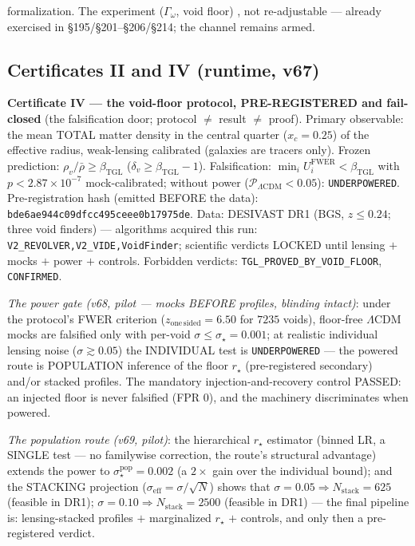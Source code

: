 \documentclass[11pt]{article}
\newcommand{\bTGL}{\beta_{\mathrm{TGL}}}\newcommand{\Msun}{M_{\odot}}\newcommand{\TGL}{\mathrm{TGL}}
\theoremstyle{definition}\newtheorem{deriv}{Derivation}
\begin{document}
formalization. The experiment ($\Gamma_\omega$, void floor) , not re-adjustable --- already exercised in \S195/\S201--\S206/\S214; the channel remains armed.

\subsection*{Certificates II and IV (runtime, v67)}

\textbf{Certificate IV --- the void-floor protocol, PRE-REGISTERED and fail-closed} (the falsification door; protocol $\neq$ result $\neq$ proof). Primary observable: the mean TOTAL matter density in the central quarter ($x_c=0.25$) of the effective radius, weak-lensing calibrated (galaxies are tracers only). Frozen prediction: $\rho_v/\bar\rho\ge\bTGL$ ($\delta_v\ge\bTGL-1$). Falsification: $\min_i U_i^{\mathrm{FWER}}<\bTGL$ with $p<2.87\times10^{-7}$ mock-calibrated; without power ($\mathcal P_{\Lambda\mathrm{CDM}}<0.05$): \texttt{UNDERPOWERED}. Pre-registration hash (emitted BEFORE the data): \texttt{bde6ae944c09dfcc495ceee0b17975de}. Data: DESIVAST DR1 (BGS, $z\le0.24$; three void finders) --- algorithms acquired this run: \texttt{V2\_REVOLVER,V2\_VIDE,VoidFinder}; scientific verdicts LOCKED until lensing $+$ mocks $+$ power $+$ controls. Forbidden verdicts: \texttt{TGL\_PROVED\_BY\_VOID\_FLOOR}, \texttt{CONFIRMED}.

\emph{The power gate (v68, pilot --- mocks BEFORE profiles, blinding intact)}: under the protocol's FWER criterion ($z_{\mathrm{one\,sided}}=6.50$ for $7235$ voids), floor-free $\Lambda$CDM mocks are falsified only with per-void $\sigma\le\sigma_\star=0.001$; at realistic individual lensing noise ($\sigma\gtrsim0.05$) the INDIVIDUAL test is \texttt{UNDERPOWERED} --- the powered route is POPULATION inference of the floor $r_\star$ (pre-registered secondary) and/or stacked profiles. The mandatory injection-and-recovery control PASSED: an injected floor is never falsified (FPR $0$), and the machinery discriminates when powered.

\emph{The population route (v69, pilot)}: the hierarchical $r_\star$ estimator (binned LR, a SINGLE test --- no familywise correction, the route's structural advantage) extends the power to $\sigma^{\mathrm{pop}}_\star=0.002$ (a $2\times$ gain over the individual bound); and the STACKING projection ($\sigma_{\mathrm{eff}}=\sigma/\sqrt{N}$) shows that $\sigma=0.05\Rightarrow N_{\mathrm{stack}}=625$ (feasible in DR1); $\sigma=0.10\Rightarrow N_{\mathrm{stack}}=2500$ (feasible in DR1) --- the final pipeline is: lensing-stacked profiles $+$ marginalized $r_\star$ $+$ controls, and only then a pre-registered verdict.
\end{document}
